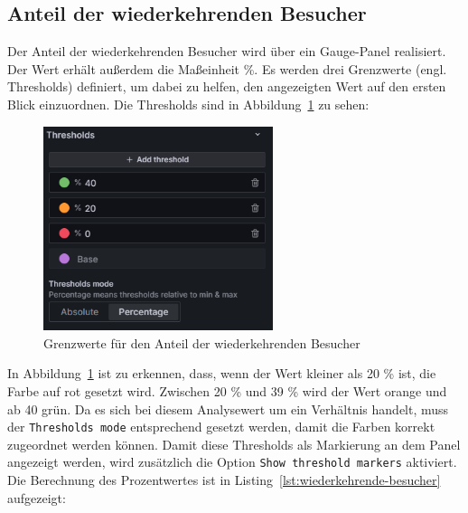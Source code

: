 \subsection{Anteil der wiederkehrenden Besucher}
Der \glqq Anteil der wiederkehrenden Besucher\grqq{} wird über ein Gauge-Panel realisiert. Der Wert erhält außerdem die Maßeinheit \%. Es werden drei Grenzwerte (engl. Thresholds) definiert, um dabei zu helfen, den angezeigten Wert auf den ersten Blick einzuordnen. Die Thresholds sind in Abbildung~\ref{fig:thresholds} zu sehen: 

\begin{figure}[H]
    \centering
    \includegraphics[width=0.6\textwidth, keepaspectratio]{images/thresholds.png}
    \caption{Grenzwerte für den \glqq Anteil der wiederkehrenden Besucher\grqq{}}
    \label{fig:thresholds}
\end{figure}

In Abbildung~\ref{fig:thresholds} ist zu erkennen, dass, wenn der Wert kleiner als 20 \% ist, die Farbe auf rot gesetzt wird. Zwischen 20 \% und 39 \% wird der Wert orange und ab 40 grün. Da es sich bei diesem Analysewert um ein Verhältnis handelt, muss der \texttt{Thresholds mode} entsprechend gesetzt werden, damit die Farben korrekt zugeordnet werden können. Damit diese Thresholds als Markierung an dem Panel angezeigt werden, wird zusätzlich die Option \texttt{Show threshold markers} aktiviert. Die Berechnung des Prozentwertes ist in Listing~\ref{lst:wiederkehrende-besucher} aufgezeigt:

\begin{figure}[H]
    \centering
    \begin{minipage}{\textwidth}
        
    \end{minipage}
\end{figure}

